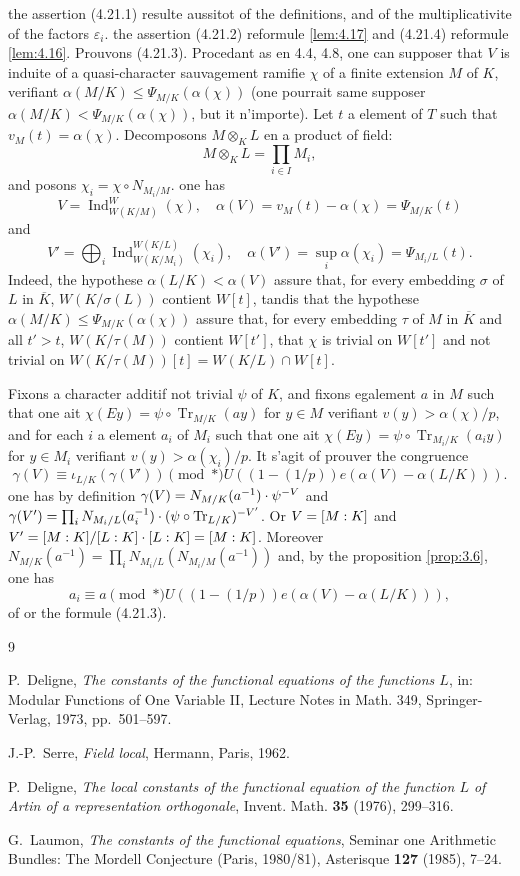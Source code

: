 \documentclass[12pt,a4paper]{article}
\theoremstyle{plain}
\theoremstyle{definition}
\theoremstyle{remark}
\DeclareMathOperator{\Ind}{Ind}
\DeclareMathOperator{\Tr}{Tr}
\let\dim\relax\let\det\relax
\providecommand{\Tr}{\operatorname{Tr}}
\begin{document}
the assertion (4.21.1) resulte aussitot of the definitions, and of the multiplicativite of the factors $\varepsilon_i$. the assertion (4.21.2) reformule \ref{lem:4.17} and (4.21.4) reformule \ref{lem:4.16}. Prouvons (4.21.3). Procedant as en 4.4, 4.8, one can supposer that $V$ is induite of a quasi-character sauvagement ramifie $\chi$ of a finite extension $M$ of $K$, verifiant $\alpha(M/K) \leq \Psi_{M/K}(\alpha(\chi))$ (one pourrait same supposer $\alpha(M/K) < \Psi_{M/K}(\alpha(\chi))$, but it n'importe). Let $t$ a element of $T$ such that $v_M(t) = \alpha(\chi)$. Decomposons $M \otimes_K L$ en a product of field:
\[
M \otimes_K L = \prod_{i \in I} M_i,
\]
and posons $\chi_i = \chi \circ N_{M_i/M}$. one has
\[
V = \Ind_{W(K/M)}^W(\chi), \quad \alpha(V) = v_M(t) - \alpha(\chi) = \Psi_{M/K}(t)
\]
and
\[
V' = \bigoplus_i \Ind_{W(K/M_i)}^{W(K/L)}(\chi_i), \quad \alpha(V') = \sup_i \alpha(\chi_i) = \Psi_{M_i/L}(t).
\]
Indeed, the hypothese $\alpha(L/K) < \alpha(V)$ assure that, for every embedding $\sigma$ of $L$ in $\overline{K}$, $W(K/\sigma(L))$ contient $W[t]$, tandis that the hypothese $\alpha(M/K) \leq \Psi_{M/K}(\alpha(\chi))$ assure that, for every embedding $\tau$ of $M$ in $\overline{K}$ and all $t' > t$, $W(K/\tau(M))$ contient $W[t']$, that $\chi$ is trivial on $W[t']$ and not trivial on $W(K/\tau(M))[t] = W(K/L) \cap W[t]$.

Fixons a character additif not trivial $\psi$ of $K$, and fixons egalement $a$ in $M$ such that one ait $\chi(Ey) = \psi \circ \Tr_{M/K}(ay)$ for $y \in M$ verifiant $v(y) > \alpha(\chi)/p$, and for each $i$ a element $a_i$ of $M_i$ such that one ait $\chi(Ey) = \psi \circ \Tr_{M_i/K}(a_i y)$ for $y \in M_i$ verifiant $v(y) > \alpha(\chi_i)/p$. It s'agit of prouver the congruence
\[
\gamma(V) \equiv \iota_{L/K}(\gamma(V')) \pmod{*} U((1-(1/p))e(\alpha(V) - \alpha(L/K))).
\]
one has by definition $\gamma(V) = N_{M/K}(a^{-1}) \cdot \psi^{-\dim V}$ and $\gamma(V') = \prod_i N_{M_i/L}(a_i^{-1}) \cdot (\psi \circ \Tr_{L/K})^{-\dim V'}$. Or $\dim V = [M:K]$ and $\dim V' = [M:K]/[L:K] \cdot [L:K] = [M:K]$. Moreover $N_{M/K}(a^{-1}) = \prod_i N_{M_i/L}(N_{M_i/M}(a^{-1}))$ and, by the proposition \ref{prop:3.6}, one has
\[
a_i \equiv a \pmod{*} U((1-(1/p))e(\alpha(V) - \alpha(L/K))),
\]
of or the formule (4.21.3).


\begin{thebibliography}{9}

P.~Deligne, \textit{The constants of the functional equations of the functions $L$}, in: Modular Functions of One Variable II, Lecture Notes in Math. 349, Springer-Verlag, 1973, pp.~501--597.

J.-P.~Serre, \textit{Field local}, Hermann, Paris, 1962.

P.~Deligne, \textit{The local constants of the functional equation of the function $L$ of Artin of a representation orthogonale}, Invent. Math. \textbf{35} (1976), 299--316.

G.~Laumon, \textit{The constants of the functional equations}, Seminar one Arithmetic Bundles: The Mordell Conjecture (Paris, 1980/81), Asterisque \textbf{127} (1985), 7--24.

\end{thebibliography}
\end{document}
